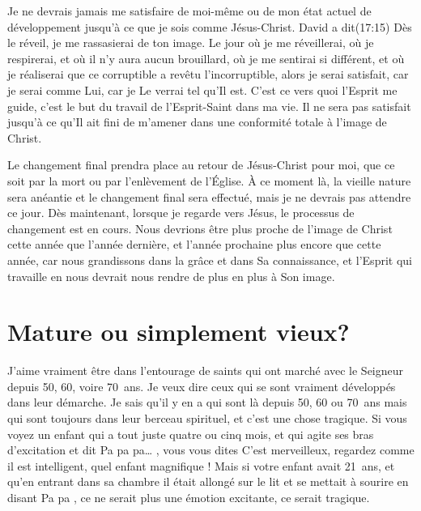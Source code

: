 Je ne devrais jamais me satisfaire de moi-même ou de mon état actuel
 de développement jusqu'à ce que je sois comme Jésus-Christ.
 David a dit\frcolon{}(17:15)
 \Og Dès le réveil, je me rassasierai de ton image. \Fg{}
 Le jour où je me réveillerai, où je respirerai,
 et où il n'y aura aucun brouillard, où je me sentirai si différent,
 et où je réaliserai que ce corruptible a revêtu l'incorruptible,
 alors je serai satisfait, car je serai comme Lui, car je Le verrai
 tel qu'Il est. C'est ce vers quoi l'Esprit me guide,
 c'est le but du travail de l'Esprit-Saint dans ma vie.
 Il ne sera pas satisfait jusqu'à ce qu'Il ait fini de m'amener
 dans une conformité totale à l'image de Christ.

Le changement final prendra place au retour de Jésus-Christ pour moi,
 que ce soit par la mort ou par l'enlèvement de l'Église.
 À ce moment là, la vieille nature sera anéantie et le changement final
 sera effectué, mais je ne devrais pas attendre ce jour.
 Dès maintenant, lorsque je regarde vers Jésus, le processus de changement
 est en cours. Nous devrions être plus proche de l'image de Christ
 cette année que l'année dernière, et l'année prochaine plus encore
 que cette année, car nous grandissons dans la grâce et dans Sa connaissance,
 et l'Esprit qui travaille en nous devrait nous rendre
 de plus en plus à Son image.


\section{Mature ou simplement vieux?}

J'aime vraiment être dans l'entourage de saints
 qui ont marché avec le Seigneur depuis 50, 60, voire 70~ans.
 Je veux dire ceux qui se sont vraiment développés dans leur démarche.
 Je sais qu'il y en a qui sont là depuis 50, 60 ou 70~ans mais qui sont
 toujours dans leur berceau spirituel, et c'est une chose tragique.
 Si vous voyez un enfant qui a tout juste quatre ou cinq mois,
 et qui agite ses bras d'excitation et dit\frcolon{}
 \Og Pa pa pa\dots{} \Fg{}, vous vous dites\frcolon{}
 \Og C'est merveilleux, regardez comme il est intelligent,
 quel enfant magnifique ! \Fg{} 
 Mais si votre enfant avait 21~ans, et qu'en entrant dans sa chambre
 il était allongé sur le lit et se mettait à sourire en disant\frcolon{}
 \Og Pa pa \Fg{}, ce ne serait plus une émotion excitante,
 ce serait tragique.

